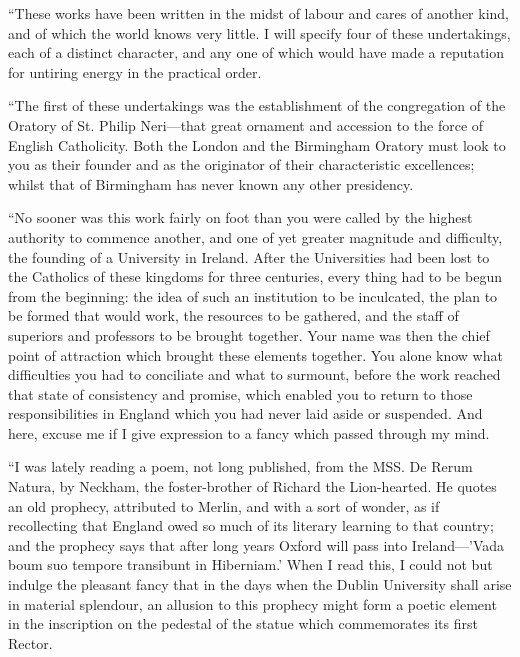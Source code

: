 ``These works have been written in the midst of labour and cares
of another kind, and of which the world knows very little. I will
specify four of these undertakings, each of a distinct character, and
any one of which would have made a reputation for untiring energy in the
practical order.

``The first of these undertakings was the establishment of the
congregation of the Oratory of St. Philip Neri—that great ornament and
accession to the force of English Catholicity. Both the London and
the Birmingham Oratory must look to you as their founder and as the
originator of their characteristic excellences; whilst that of
Birmingham has never known any other presidency.

``No sooner was this work fairly on foot than you were called by
the highest authority to commence another, and one of yet greater
magnitude and difficulty, the founding of a University in Ireland. After
the Universities had been lost to the Catholics of these kingdoms for
three centuries, every thing had to be begun from the beginning: the
idea of such an institution to be inculcated, the plan to be formed that
would work, the resources to be gathered, and the staff of superiors and
professors to be brought together. Your name was then the chief point of
attraction which brought these elements together. You alone know what
difficulties you had to conciliate and what to surmount, before the work
reached that state of consistency and promise, which enabled you to
return to those responsibilities in England which you had never laid
aside or suspended. And here, excuse me if I give expression to a fancy
which passed through my mind.

``I was lately reading a poem, not long published, from the MSS.
De Rerum Natura, by Neckham, the foster-brother of Richard the
Lion-hearted. He quotes an old prophecy, attributed to Merlin, and with
a sort of wonder, as if recollecting that England owed so much of its
literary learning to that country; and the prophecy says that after long
years Oxford will pass into Ireland—'Vada boum suo tempore transibunt
in Hiberniam.' When I read this, I could not but indulge the pleasant
fancy that in the days when the Dublin University shall arise in
material splendour, an allusion to this prophecy might form a poetic
element in the inscription on the pedestal of the statue which
commemorates its first Rector.

